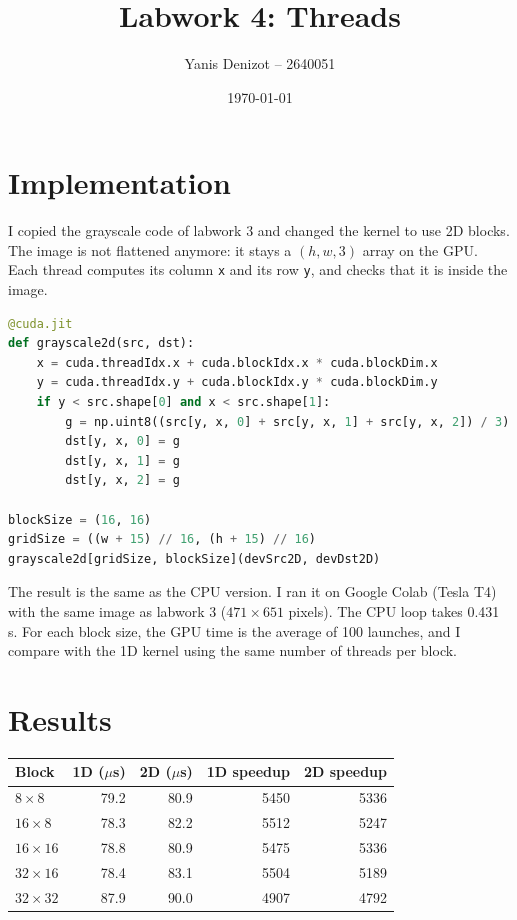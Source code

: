 \documentclass[11pt,a4paper]{article}
\title{Labwork 4: Threads}
\author{Yanis Denizot -- 2640051}
\date{\today}
\begin{document}
\maketitle

\section{Implementation}
I copied the grayscale code of labwork 3 and changed the kernel to use 2D blocks. The image
is not flattened anymore: it stays a $(h, w, 3)$ array on the GPU. Each thread computes its
column \texttt{x} and its row \texttt{y}, and checks that it is inside the image.

\begin{lstlisting}[language=Python]
@cuda.jit
def grayscale2d(src, dst):
    x = cuda.threadIdx.x + cuda.blockIdx.x * cuda.blockDim.x
    y = cuda.threadIdx.y + cuda.blockIdx.y * cuda.blockDim.y
    if y < src.shape[0] and x < src.shape[1]:
        g = np.uint8((src[y, x, 0] + src[y, x, 1] + src[y, x, 2]) / 3)
        dst[y, x, 0] = g
        dst[y, x, 1] = g
        dst[y, x, 2] = g

blockSize = (16, 16)
gridSize = ((w + 15) // 16, (h + 15) // 16)
grayscale2d[gridSize, blockSize](devSrc2D, devDst2D)
\end{lstlisting}

The result is the same as the CPU version. I ran it on Google Colab (Tesla T4) with the same
image as labwork 3 ($471 \times 651$ pixels). The CPU loop takes 0.431 s. For each block
size, the GPU time is the average of 100 launches, and I compare with the 1D kernel using the
same number of threads per block.

\section{Results}

\begin{table}[H]
\centering
\begin{tabular}{lrrrr}
\toprule
Block & 1D ($\mu$s) & 2D ($\mu$s) & 1D speedup & 2D speedup \\
\midrule
$8 \times 8$   & 79.2 & 80.9 & 5450 & 5336 \\
$16 \times 8$  & 78.3 & 82.2 & 5512 & 5247 \\
$16 \times 16$ & 78.8 & 80.9 & 5475 & 5336 \\
$32 \times 16$ & 78.4 & 83.1 & 5504 & 5189 \\
$32 \times 32$ & 87.9 & 90.0 & 4907 & 4792 \\
\bottomrule
\end{tabular}
\end{table}
\end{document}
